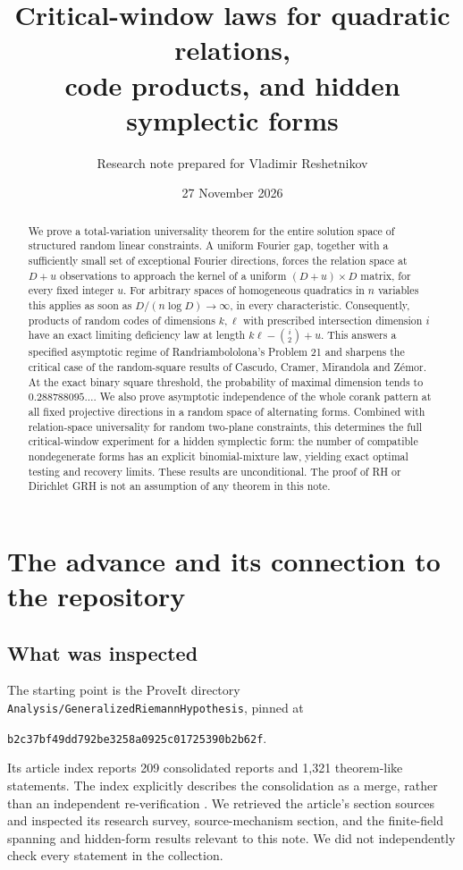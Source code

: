 \documentclass[11pt]{article}
\title{Critical-window laws for quadratic relations,\\code products, and hidden symplectic forms}
\author{Research note prepared for Vladimir Reshetnikov}
\date{27 November 2026}
\theoremstyle{definition}
\theoremstyle{remark}
\begin{document}
\maketitle
\begin{abstract}
We prove a total-variation universality theorem for the entire solution
space of structured random linear constraints. A uniform Fourier gap,
together with a sufficiently small set of exceptional Fourier directions,
forces the relation space at $D+u$ observations to approach the kernel of
a uniform $(D+u)\times D$ matrix, for every fixed integer $u$.
For arbitrary spaces of homogeneous quadratics in $n$ variables this
applies as soon as $D/(n\log D)\to\infty$, in every characteristic.
Consequently, products of random codes of dimensions $k,\ell$ with
prescribed intersection dimension $i$ have an exact limiting deficiency
law at length $k\ell-\binom i2+u$. This answers a specified asymptotic
regime of Randriambololona's Problem 21 and sharpens the critical case
of the random-square results of Cascudo, Cramer, Mirandola and Z\'emor.
At the exact binary square threshold, the probability of maximal
dimension tends to $0.288788095\ldots$.
We also prove asymptotic independence of the whole corank pattern at
all fixed projective directions in a random space of alternating forms.
Combined with relation-space universality for random two-plane
constraints, this determines the full critical-window experiment for a
hidden symplectic form: the number of compatible nondegenerate forms
has an explicit binomial-mixture law, yielding exact optimal testing and
recovery limits. These results are unconditional. The proof of RH or
Dirichlet GRH is not an assumption of any theorem in this note.
\end{abstract}

\tableofcontents

\section{The advance and its connection to the repository}
\label{sec:intro}

\subsection{What was inspected}
The starting point is the ProveIt directory
\texttt{Analysis/GeneralizedRiemannHypothesis}, pinned at
\begin{center}\small\texttt{b2c37bf49dd792be3258a0925c01725390b2b62f}.\end{center}
Its article index reports 209 consolidated reports and 1,321 theorem-like
statements. The index explicitly describes the consolidation as a merge,
rather than an independent re-verification \cite{ProveItArticle}.
We retrieved the article's section sources and inspected its research
survey, source-mechanism section, and the finite-field spanning and
hidden-form results relevant to this note. We did not independently
check every statement in the collection.
\end{document}
